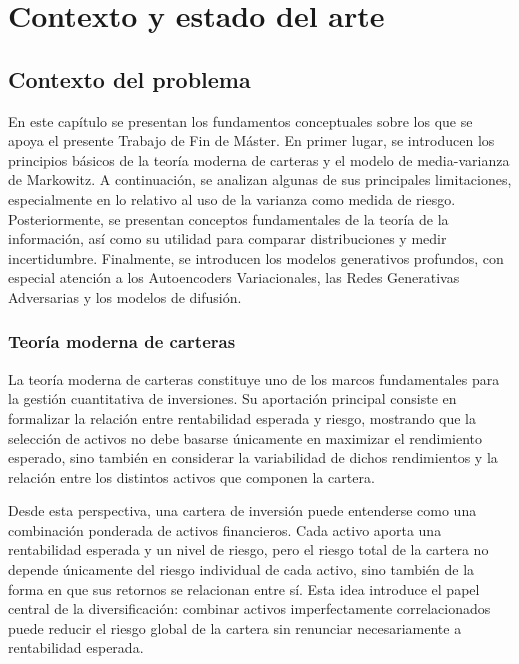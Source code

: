 \clearpage
\chapter{Contexto y estado del arte}

\section{Contexto del problema}


En este capítulo se presentan los fundamentos conceptuales sobre los que se apoya el presente Trabajo de Fin de Máster. En primer lugar, se introducen los principios básicos de la teoría moderna de carteras y el modelo de media-varianza de Markowitz. A continuación, se analizan algunas de sus principales limitaciones, especialmente en lo relativo al uso de la varianza como medida de riesgo. Posteriormente, se presentan conceptos fundamentales de la teoría de la información, así como su utilidad para comparar distribuciones y medir incertidumbre. Finalmente, se introducen los modelos generativos profundos, con especial atención a los Autoencoders Variacionales, las Redes Generativas Adversarias y los modelos de difusión.

\subsection{Teoría moderna de carteras}

La teoría moderna de carteras constituye uno de los marcos fundamentales para la gestión cuantitativa de inversiones. Su aportación principal consiste en formalizar la relación entre rentabilidad esperada y riesgo, mostrando que la selección de activos no debe basarse únicamente en maximizar el rendimiento esperado, sino también en considerar la variabilidad de dichos rendimientos y la relación entre los distintos activos que componen la cartera.

Desde esta perspectiva, una cartera de inversión puede entenderse como una combinación ponderada de activos financieros. Cada activo aporta una rentabilidad esperada y un nivel de riesgo, pero el riesgo total de la cartera no depende únicamente del riesgo individual de cada activo, sino también de la forma en que sus retornos se relacionan entre sí. Esta idea introduce el papel central de la diversificación: combinar activos imperfectamente correlacionados puede reducir el riesgo global de la cartera sin renunciar necesariamente a rentabilidad esperada.

